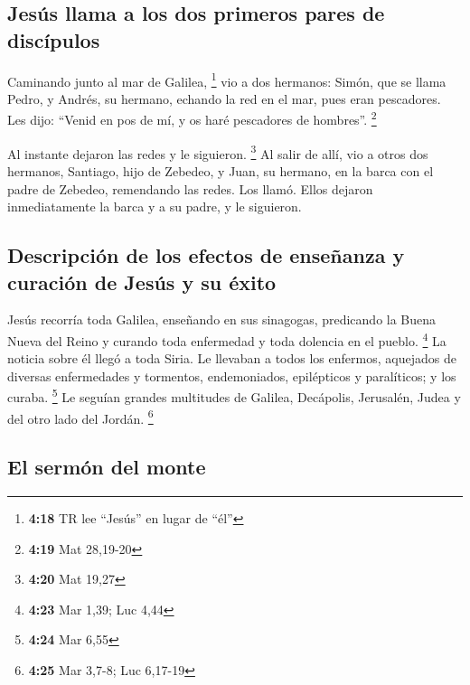 \hypertarget{jesuxfas-llama-a-los-dos-primeros-pares-de-discuxedpulos}{%
\subsection{Jesús llama a los dos primeros pares de
discípulos}\label{jesuxfas-llama-a-los-dos-primeros-pares-de-discuxedpulos}}

 Caminando junto al mar de Galilea, \footnote{\textbf{4:18}
  TR lee ``Jesús'' en lugar de ``él''} vio a dos hermanos: Simón, que se
llama Pedro, y Andrés, su hermano, echando la red en el mar, pues eran
pescadores.  Les dijo: ``Venid en pos de mí, y os haré
pescadores de hombres''. \footnote{\textbf{4:19} Mat 28,19-20}

 Al instante dejaron las redes y le siguieron.
\footnote{\textbf{4:20} Mat 19,27}  Al salir de allí, vio
a otros dos hermanos, Santiago, hijo de Zebedeo, y Juan, su hermano, en
la barca con el padre de Zebedeo, remendando las redes. Los llamó.
 Ellos dejaron inmediatamente la barca y a su padre, y le
siguieron.

\hypertarget{descripciuxf3n-de-los-efectos-de-enseuxf1anza-y-curaciuxf3n-de-jesuxfas-y-su-uxe9xito}{%
\subsection{Descripción de los efectos de enseñanza y curación de Jesús
y su
éxito}\label{descripciuxf3n-de-los-efectos-de-enseuxf1anza-y-curaciuxf3n-de-jesuxfas-y-su-uxe9xito}}

 Jesús recorría toda Galilea, enseñando en sus sinagogas,
predicando la Buena Nueva del Reino y curando toda enfermedad y toda
dolencia en el pueblo. \footnote{\textbf{4:23} Mar 1,39; Luc 4,44}
 La noticia sobre él llegó a toda Siria. Le llevaban a
todos los enfermos, aquejados de diversas enfermedades y tormentos,
endemoniados, epilépticos y paralíticos; y los curaba. \footnote{\textbf{4:24}
  Mar 6,55}  Le seguían grandes multitudes de Galilea,
Decápolis, Jerusalén, Judea y del otro lado del Jordán. \footnote{\textbf{4:25}
  Mar 3,7-8; Luc 6,17-19}

\hypertarget{el-sermuxf3n-del-monte}{%
\subsection{El sermón del monte}\label{el-sermuxf3n-del-monte}}

